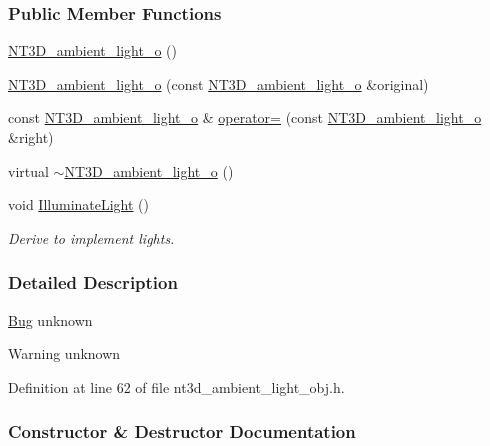 \subsubsection*{Public Member Functions}
\begin{DoxyCompactItemize}
\item 
\hyperlink{class_n_t3_d__ambient__light__o_a5531927b81c9718d7c2cbe93776340a5}{NT3D\_\-ambient\_\-light\_\-o} ()
\item 
\hyperlink{class_n_t3_d__ambient__light__o_ad9000d1042790e47ea83e99fb321973f}{NT3D\_\-ambient\_\-light\_\-o} (const \hyperlink{class_n_t3_d__ambient__light__o}{NT3D\_\-ambient\_\-light\_\-o} \&original)
\item 
const \hyperlink{class_n_t3_d__ambient__light__o}{NT3D\_\-ambient\_\-light\_\-o} \& \hyperlink{class_n_t3_d__ambient__light__o_a4ed4c4ca8af100e19ef64ce459841536}{operator=} (const \hyperlink{class_n_t3_d__ambient__light__o}{NT3D\_\-ambient\_\-light\_\-o} \&right)
\item 
virtual \hyperlink{class_n_t3_d__ambient__light__o_a955ba5df46d8c8ae481ce3b7efeceb33}{$\sim$NT3D\_\-ambient\_\-light\_\-o} ()
\item 
void \hyperlink{class_n_t3_d__ambient__light__o_a882b74fe26d8f774f91b0e56bcfbdcc9}{IlluminateLight} ()
\begin{DoxyCompactList}\small\item\em Derive to implement lights. \item\end{DoxyCompactList}\end{DoxyCompactItemize}


\subsubsection{Detailed Description}
\begin{Desc}
\item[\hyperlink{bug__bug000004}{Bug}]unknown \end{Desc}
\begin{DoxyWarning}{Warning}
unknown 
\end{DoxyWarning}


Definition at line 62 of file nt3d\_\-ambient\_\-light\_\-obj.h.



\subsubsection{Constructor \& Destructor Documentation}
